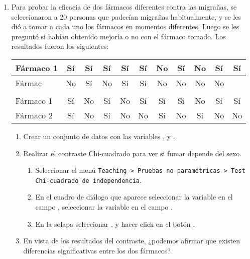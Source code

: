 \begin{enumerate}[leftmargin=*]
\item Para probar la eficacia de dos fármacos diferentes contra las migrañas, se seleccionaron a 20 personas que
padecían migrañas habitualmente, y se les dió a tomar a cada uno los fármacos en momentos diferentes. Luego se les
preguntó si habían obtenido mejoría o no con el fármaco tomado. Los resultados fueron los siguientes:
\begin{center}
\begin{tabular}{lcccccccccc}
\hline
Fármaco 1 & Sí & Sí & Sí & Sí& Sí & No & Sí & No& Sí & Sí  \\
\hline
Fármac\button{o & No & Sí & No & Sí & Sí & No & No& No & No \\
\hline\\
\hline
Fármaco 1 & Sí & No& Sí & No & Sí & Sí& Sí & No & Sí & Sí \\
\hline
Fármaco 2 & Sí & No& Sí & No & No & Sí& No & Sí & No & No\\
\hline
\end{tabular}
\end{center}

\begin{enumerate}
\item Crear un conjunto de datos con las variables , y .

\item Realizar el contraste Chi-cuadrado para ver si fumar depende del sexo.  
\begin{indicacion}
\begin{enumerate}
\item Seleccionar el menú \texttt{Teaching > Pruebas no paramétricas > Test Chi-cuadrado de independencia}.
\item En el cuadro de diálogo que aparece seleccionar la variable  en el campo , seleccionar la variable  en el campo .
\item En la solapa  seleccionar , y hacer click en el
botón .
\end{enumerate}
\end{indicacion}


\item En vista de los resultados del contraste, ¿podemos afirmar que existen diferencias significativas entre los dos
fármacos?
\end{enumerate}

\end{enumerate}


